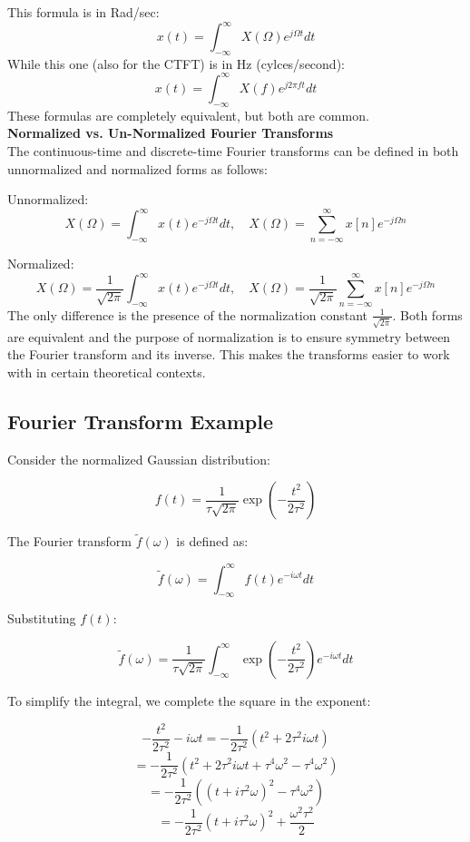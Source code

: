 \documentclass[12pt]{article}
\begin{document}
This formula is in Rad/sec: 
\[x(t) = \int_{-\infty}^{\infty} X(\Omega) e^{j \Omega t} dt\]
While this one (also for the CTFT) is in Hz (cylces/second):
\[x(t) = \int_{-\infty}^{\infty} X(f) e^{j 2\pi f t} dt\]
These formulas are completely equivalent, but both are common. \\
\noindent
\textbf{Normalized vs. Un-Normalized Fourier Transforms}\\

The continuous-time and discrete-time Fourier transforms can be defined in both unnormalized and normalized forms as follows:

Unnormalized:
\[
X(\Omega) = \int_{-\infty}^{\infty} x(t) e^{-j \Omega t} dt, \quad X(\Omega) = \sum_{n=-\infty}^{\infty} x[n] e^{-j \Omega n}
\]

Normalized:
\[
X(\Omega) = \frac{1}{\sqrt{2\pi}} \int_{-\infty}^{\infty} x(t) e^{-j \Omega t} dt, \quad X(\Omega) = \frac{1}{\sqrt{2\pi}} \sum_{n=-\infty}^{\infty} x[n] e^{-j \Omega n}
\]
The only difference is the presence of the normalization constant \(\frac{1}{\sqrt{2\pi}}\). Both forms are equivalent and the purpose of normalization is to ensure symmetry between the Fourier transform and its inverse. This makes the transforms easier to work with in certain theoretical contexts.

\subsection{Fourier Transform Example}

Consider the normalized Gaussian distribution:

\[ f(t) = \frac{1}{\tau \sqrt{2\pi}} \exp \left( - \frac{t^2}{2\tau^2} \right) \]

The Fourier transform \( \tilde{f}(\omega) \) is defined as:

\[ \tilde{f}(\omega) = \int_{-\infty}^{\infty} f(t) e^{-i \omega t} dt \]

Substituting \( f(t) \):

\[ \tilde{f}(\omega) = \frac{1}{\tau \sqrt{2\pi}} \int_{-\infty}^{\infty} \exp \left( - \frac{t^2}{2\tau^2} \right) e^{-i \omega t} dt \]

To simplify the integral, we complete the square in the exponent:

\[ - \frac{t^2}{2\tau^2} - i \omega t = -\frac{1}{2\tau^2} \left( t^2 + 2\tau^2 i \omega t \right) \]
\[ = -\frac{1}{2\tau^2} \left( t^2 + 2\tau^2 i \omega t + \tau^4 \omega^2 - \tau^4 \omega^2 \right) \]
\[ = -\frac{1}{2\tau^2} \left( (t + i\tau^2 \omega)^2 - \tau^4 \omega^2 \right) \]
\[ = -\frac{1}{2\tau^2} (t + i\tau^2 \omega)^2 + \frac{\omega^2 \tau^2}{2} \]
\end{document}
